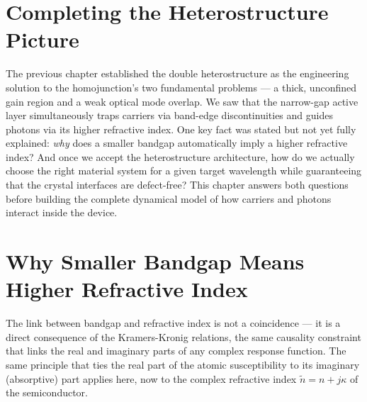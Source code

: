
\section{Completing the Heterostructure Picture}

The previous chapter established the double heterostructure as the engineering solution to the homojunction's two fundamental problems — a thick, unconfined gain region and a weak optical mode overlap. We saw that the narrow-gap active layer simultaneously traps carriers via band-edge discontinuities and guides photons via its higher refractive index. One key fact was stated but not yet fully explained: \emph{why} does a smaller bandgap automatically imply a higher refractive index? And once we accept the heterostructure architecture, how do we actually choose the right material system for a given target wavelength while guaranteeing that the crystal interfaces are defect-free? This chapter answers both questions before building the complete dynamical model of how carriers and photons interact inside the device.

\section{Why Smaller Bandgap Means Higher Refractive Index}

The link between bandgap and refractive index is not a coincidence — it is a direct consequence of the Kramers-Kronig relations, the same causality constraint that links the real and imaginary parts of any complex response function. The same principle that ties the real part of the atomic susceptibility to its imaginary (absorptive) part applies here, now to the complex refractive index $\tilde{n} = n + j\kappa$ of the semiconductor.

